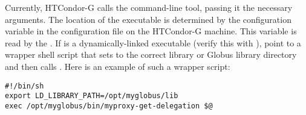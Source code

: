 Currently, HTCondor-G calls the
 command-line tool,
passing it the necessary arguments.
The location of the
 executable is determined by the
configuration variable
 in the configuration file
on the HTCondor-G machine.
This variable is read by the .
If
is a dynamically-linked executable
(verify this with ),
point
to a wrapper shell script that sets
 to the correct 
library or Globus library directory and then
calls .
Here is an example of such a wrapper script:

\footnotesize
\begin{verbatim}
#!/bin/sh
export LD_LIBRARY_PATH=/opt/myglobus/lib
exec /opt/myglobus/bin/myproxy-get-delegation $@
\end{verbatim}
\normalsize

